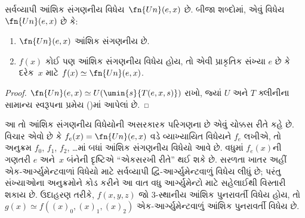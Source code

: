 \documentclass[../../../include/open-logic-section]{subfiles}
\begin{document}

\begin{thm}
સર્વવ્યાપી આંશિક સંગણનીય વિધેય~$\fn{Un}(e,x)$ છે. બીજા શબ્દોમાં,
એવું વિધેય $\fn{Un}(e,x)$ છે કે:
\begin{enumerate}
\item $\fn{Un}(e,x)$ આંશિક સંગણનીય છે.
\item $f(x)$ કોઈ પણ આંશિક સંગણનીય વિધેય હોય, તો એવી
પ્રાકૃતિક સંખ્યા $e$ છે કે દરેક~$x$ માટે $f(x) \simeq \fn{Un}(e,x)$.
\end{enumerate}
\end{thm}

\begin{proof}
$\fn{Un}(e,x) \simeq U(\umin{s}{T(e,x,s)})$ રાખો, જ્યાં $U$ અને $T$
ક્લીનીના સામાન્ય સ્વરૂપના પ્રમેય ()માં
આપેલાં છે.
\end{proof}

\begin{explain}
આ તો આંશિક સંગણનીય વિધેયોની અસરકારક પરિગણના છે એવું ચોક્કસ રીતે
કહે છે. વિચાર એવો છે કે $f_e(x) = \fn{Un}(e,x)$ વડે વ્યાખ્યાયિત
વિધેયને $f_e$ લખીએ, તો અનુક્રમ $f_0$, $f_1$, $f_2$, \dots માં બધાં
આંશિક સંગણનીય વિધેયો આવે છે. વધુમાં $f_e(x)$ની ગણતરી $e$ અને~$x$
બંનેની દૃષ્ટિએ ``એકસરખી રીતે'' થઈ શકે છે. સરળતા ખાતર અહીં એક-આર્ગ્યુમેન્ટવાળાં
વિધેયો માટે સર્વવ્યાપી દ્વિ-આર્ગ્યુમેન્ટવાળું વિધેય લીધું છે; પરંતુ
સંખ્યાઓના અનુક્રમોને કોડ કરીને આ વાત વધુ આર્ગ્યુમેન્ટો માટે સહેલાઈથી
વિસ્તારી શકાય છે. ઉદાહરણ તરીકે, $f(x,y,z)$ જો $3$-સ્થાનીય આંશિક
પુનરાવર્તી વિધેય હોય, તો $g(x) \simeq f((x)_0, (x)_1, (x)_2)$
એક-આર્ગ્યુમેન્ટવાળું આંશિક પુનરાવર્તી વિધેય છે.
\end{explain}
\end{document}
